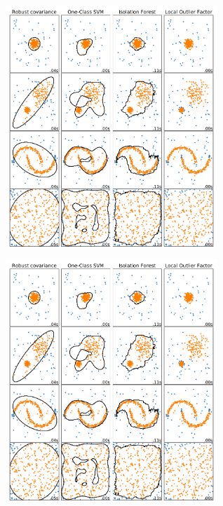 \documentclass[slidetop,11pt]{beamer}
\begin{document}
\begin{frame}[plain]
    
\begin{center}
\includegraphics[width=8cm]{img/anomaly_comparison.pdf}
\end{center}

\end{frame}


\begin{frame}[plain]
    
\begin{center}
\includegraphics[width=8cm]{img/anomaly_comparison.pdf}
\end{center}

\end{frame}
\end{document}
